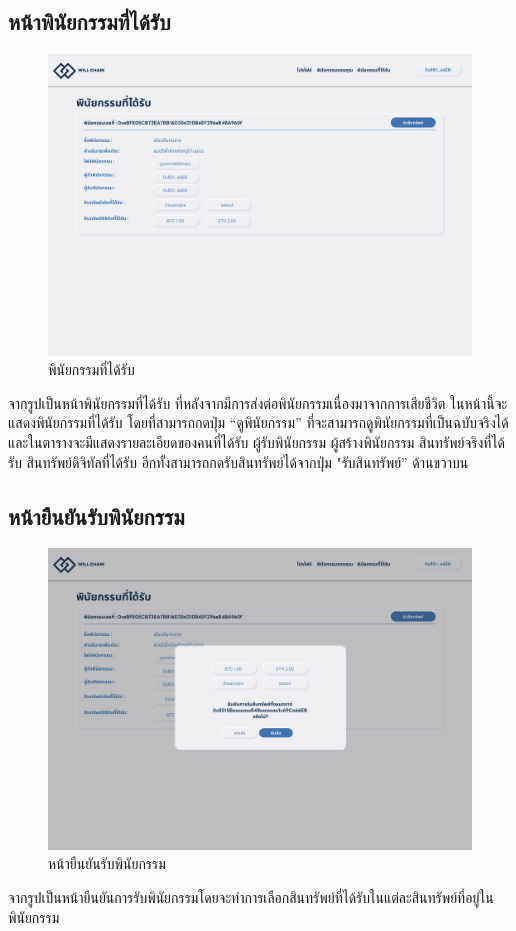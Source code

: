 \documentclass[12pt,oneside,openright,a4paper]{cpe-thai-project}
\begin{document}
\subsection{หน้าพินัยกรรมที่ได้รับ}
		\begin{figure}[!thb]
			\centering
			\includegraphics[scale=0.2]{claimWill}
			\caption{พินัยกรรมที่ได้รับ}
		\end{figure}
		\FloatBarrier
		\tab จากรูปเป็นหน้าพินัยกรรมที่ได้รับ ที่หลังจากมีการส่งต่อพินัยกรรมเนื่องมาจากการเสียชีวิต ในหน้านี้จะแสดงพินัยกรรมที่ได้รับ โดยที่สามารถกดปุ่ม “ดูพินัยกรรม” ที่จะสามารถดูพินัยกรรมที่เป็นฉบับจริงได้ และในตารางจะมีแสดงรายละเอียดของคนที่ได้รับ ผู้รับพินัยกรรม ผู้สร้างพินัยกรรม สินทรัพย์จริงที่ได้รับ สินทรัพย์ดิจิทัลที่ได้รับ อีกทั้งสามารถกดรับสินทรัพย์ได้จากปุ่ม "รับสินทรัพย์'' ด้านขวาบน
\subsection{หน้ายืนยันรับพินัยกรรม}
		\begin{figure}[!thb]
			\centering
			\includegraphics[scale=0.2]{claimWillConfirm}
			\caption{หน้ายืนยันรับพินัยกรรม}
		\end{figure}
		\FloatBarrier
		\tab จากรูปเป็นหน้ายืนยันการรับพินัยกรรมโดยจะทำการเลือกสินทรัพย์ที่ได้รับในแต่ละสินทรัพย์ที่อยู่ในพินัยกรรม
		
\end{document}
